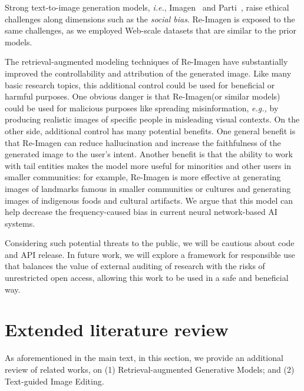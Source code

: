 \documentclass{article} \usepackage{iclr2023_conference,times}
\newcommand{\ie}{\textit{i.e.}}
\newcommand{\modelname}{{Re-Imagen}\xspace}
\begin{document}
Strong text-to-image generation models, \ie, Imagen~\citep{saharia2022photorealistic} and Parti~\citep{yu2022scaling}, raise ethical challenges along dimensions such as the \textit{social bias}. \modelname is exposed to the same challenges, as we employed Web-scale datasets that are similar to the prior models.

The retrieval-augmented modeling techniques of \modelname have substantially improved the controllability and attribution of the generated image.  Like many basic research topics, this additional control could be used for beneficial or harmful purposes.  One obvious danger is that \modelname (or similar models)  could be used for malicious purposes like spreading misinformation, \textit{e.g.,} by producing realistic images of specific people in misleading visual contexts. On the other side, additional control has many potential benefits.  One general benefit is that \modelname can reduce hallucination and increase the faithfulness of the generated image to the user's intent.  Another benefit is that the ability to work with tail entities makes the model more useful for minorities and other users in smaller communities: for example, \modelname is more effective at generating images of landmarks famous in smaller communities or cultures and generating images of indigenous foods and cultural artifacts. We argue that this model can help decrease the frequency-caused bias in current neural network-based AI systems.

Considering such potential threats to the public, we will be cautious about code and API release. In future work, we will explore a framework for responsible use that balances the value of external auditing of research with the risks of unrestricted open access, allowing this work to be used in a safe and beneficial way.







\clearpage

\appendix

\section{Extended literature review}
\label{extended_review}

As aforementioned in the main text, in this section, we provide an additional review of related works, on (1) {Retrieval-augmented Generative Models}; and (2) {Text-guided Image Editing}.
\end{document}
